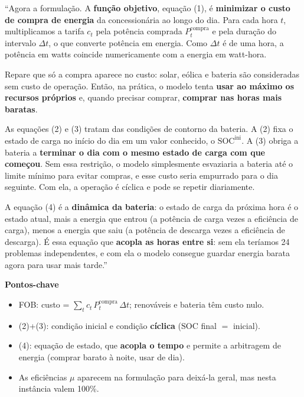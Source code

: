 \documentclass[11pt,a4paper]{article}
\begin{document}
\begin{fala}
``Agora a formulação. A \textbf{função objetivo}, equação (1), é \textbf{minimizar o custo de compra de energia}
da concessionária ao longo do dia. Para cada hora $t$, multiplicamos a tarifa $c_t$ pela potência comprada
$P^{\text{compra}}_t$ e pela duração do intervalo $\Delta t$, o que converte potência em energia. Como $\Delta t$ é
de uma hora, a potência em watts coincide numericamente com a energia em watt-hora.

Repare que só a compra aparece no custo: solar, eólica e bateria são consideradas sem custo de operação.
Então, na prática, o modelo tenta \textbf{usar ao máximo os recursos próprios} e, quando precisar comprar,
\textbf{comprar nas horas mais baratas}.

As equações (2) e (3) tratam das condições de contorno da bateria. A (2) fixa o estado de carga no início do dia
em um valor conhecido, o $\mathrm{SOC}^{\text{ini}}$. A (3) obriga a bateria a \textbf{terminar o dia com o
mesmo estado de carga com que começou}. Sem essa restrição, o modelo simplesmente esvaziaria a bateria até o
limite mínimo para evitar compras, e esse custo seria empurrado para o dia seguinte. Com ela, a operação é
cíclica e pode se repetir diariamente.

A equação (4) é a \textbf{dinâmica da bateria}: o estado de carga da próxima hora é o estado atual, mais a energia
que entrou (a potência de carga vezes a eficiência de carga), menos a energia que saiu (a potência de descarga
vezes a eficiência de descarga). É essa equação que \textbf{acopla as horas entre si}: sem ela teríamos 24
problemas independentes, e com ela o modelo consegue guardar energia barata agora para usar mais tarde.''
\end{fala}

\noindent\textbf{Pontos-chave}
\begin{itemize}
  \item FOB: custo = $\sum_t c_t\,P^{\text{compra}}_t\,\Delta t$; renováveis e bateria têm custo nulo.
  \item (2)+(3): condição inicial e condição \textbf{cíclica} ($\mathrm{SOC}$ final $=$ inicial).
  \item (4): equação de estado, que \textbf{acopla o tempo} e permite a arbitragem de energia
        (comprar barato à noite, usar de dia).
  \item As eficiências $\mu$ aparecem na formulação para deixá-la geral, mas nesta instância valem 100\%.
\end{itemize}
\end{document}
